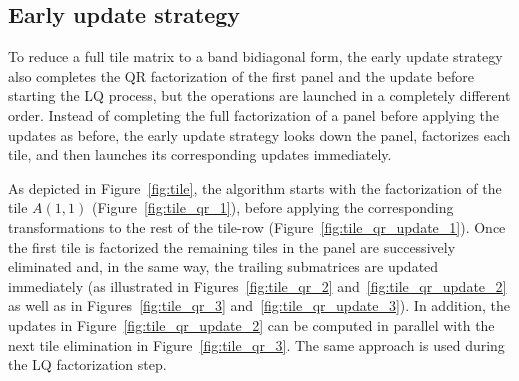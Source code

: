 \subsection{Early update strategy}
To reduce a full tile matrix to a band bidiagonal form,
the early update strategy also completes the QR factorization
of the first panel and the update before starting the LQ process,
but the operations are launched in a completely different order.
Instead of completing the full factorization of a panel
before applying the updates as before,
the early update strategy looks down the panel,
factorizes each tile, and then launches
its corresponding updates immediately.

As depicted in Figure~\ref{fig:tile}, the algorithm starts with the
factorization of the tile $A(1,1)$ (Figure~\ref{fig:tile_qr_1}),
before applying the corresponding transformations to the rest of the
tile-row (Figure~\ref{fig:tile_qr_update_1}).
Once the first tile is factorized
the remaining tiles in the panel are successively eliminated
and, in the same way, the trailing submatrices are updated immediately
(as illustrated in Figures~\ref{fig:tile_qr_2}
and~\ref{fig:tile_qr_update_2}
as well as in Figures~\ref{fig:tile_qr_3}
and~\ref{fig:tile_qr_update_3}).
In addition,
the updates in Figure~\ref{fig:tile_qr_update_2} can be computed in parallel
with the next tile elimination in Figure~\ref{fig:tile_qr_3}.
The same approach is used during the LQ factorization step.

